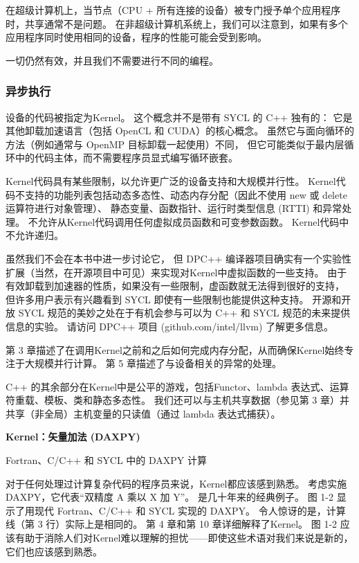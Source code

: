在超级计算机上，当节点（CPU + 所有连接的设备）被专门授予单个应用程序时，共享通常不是问题。 
在非超级计算机系统上，我们可以注意到，如果有多个应用程序同时使用相同的设备，程序的性能可能会受到影响。

一切仍然有效，并且我们不需要进行不同的编程。

\subsubsection{异步执行}
设备的代码被指定为Kernel。 这个概念并不是带有 SYCL 的 C++ 独有的：
它是其他卸载加速语言（包括 OpenCL 和 CUDA）的核心概念。 
虽然它与面向循环的方法（例如通常与 OpenMP 目标卸载一起使用）不同，
但它可能类似于最内层循环中的代码主体，而不需要程序员显式编写循环嵌套。

Kernel代码具有某些限制，以允许更广泛的设备支持和大规模并行性。 
Kernel代码不支持的功能列表包括动态多态性、动态内存分配（因此不使用 new 或 delete 运算符进行对象管理）、
静态变量、函数指针、运行时类型信息 (RTTI) 和异常处理。 不允许从Kernel代码调用任何虚拟成员函数和可变参数函数。 
Kernel代码中不允许递归。

\begin{remark}[虚函数]
	虽然我们不会在本书中进一步讨论它，
	但 DPC++ 编译器项目确实有一个实验性扩展（当然，在开源项目中可见）来实现对Kernel中虚拟函数的一些支持。 
	由于有效卸载到加速器的性质，如果没有一些限制，虚函数就无法得到很好的支持，
	但许多用户表示有兴趣看到 SYCL 即使有一些限制也能提供这种支持。 
	开源和开放 SYCL 规范的美妙之处在于有机会参与可以为 C++ 和 SYCL 规范的未来提供信息的实验。 
	请访问 DPC++ 项目 (github.com/intel/llvm) 了解更多信息。
\end{remark}

第 3 章描述了在调用Kernel之前和之后如何完成内存分配，从而确保Kernel始终专注于大规模并行计算。 
第 5 章描述了与设备相关的异常的处理。

C++ 的其余部分在Kernel中是公平的游戏，包括Functor、lambda 表达式、运算符重载、模板、类和静态多态性。 
我们还可以与主机共享数据（参见第 3 章）并共享（非全局）主机变量的只读值（通过 lambda 表达式捕获）。

\textbf{Kernel：矢量加法 (DAXPY)}

{\color{red} Fortran、C/C++ 和 SYCL 中的 DAXPY 计算 }

对于任何处理过计算复杂代码的程序员来说，Kernel都应该感到熟悉。 
考虑实施 DAXPY，它代表“双精度 A 乘以 X 加 Y”。 是几十年来的经典例子。 
图 1-2 显示了用现代 Fortran、C/C++ 和 SYCL 实现的 DAXPY。 
令人惊讶的是，计算线（第 3 行）实际上是相同的。 第 4 章和第 10 章详细解释了Kernel。 
图 1-2 应该有助于消除人们对Kernel难以理解的担忧——即使这些术语对我们来说是新的，它们也应该感到熟悉。

